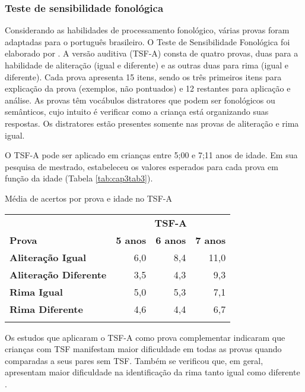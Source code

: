 \documentclass[output=paper,colorlinks,citecolor=brown,booklanguage=portuguese]{langscibook}
\begin{document}
\subsubsection{Teste de sensibilidade fonológica}
Considerando as habilidades de processamento fonológico, várias provas foram adaptadas para o português brasileiro. O Teste de Sensibilidade Fonológica foi elaborado por \citet{Herrero2001}. A versão auditiva (TSF-A) consta de quatro provas, duas para a habilidade de aliteração (igual e diferente) e as outras duas para rima (igual e diferente). Cada prova apresenta 15 itens, sendo os três primeiros itens para explicação da prova (exemplos, não pontuados) e 12 restantes para aplicação e análise. As provas têm vocábulos distratores que podem ser fonológicos ou semânticos, cujo intuito é verificar como a criança está organizando suas respostas. Os distratores estão presentes somente nas provas de aliteração e rima igual. 

O TSF-A pode ser aplicado em crianças entre 5;00 e 7;11 anos de idade. Em sua pesquisa de mestrado, \citet{Herrero2001} estabeleceu os valores esperados para cada prova em função da idade (Tabela \ref{tab:cap3tab3}). 




\begin{Tabela}
\caption{Média de acertos por prova e idade no TSF-A}
\label{tab:cap3tab3}


\begin{tabularx}{.65\textwidth}{lrrr}
\lsptoprule
 & \multicolumn{3}{c}{\textbf{TSF-A}} \\
 \cmidrule(lr){2-4}
 \textbf{Prova} & \textbf{5 anos} & \textbf{6 anos} & \textbf{7 anos}\\
 \midrule
 \textbf{Aliteração Igual} & 6,0 & 8,4 & 11,0\\
 \textbf{Aliteração Diferente} & 3,5 & 4,3 & 9,3\\
 \textbf{Rima Igual} & 5,0 & 5,3 & 7,1\\
 \textbf{Rima Diferente} & 4,6 & 4,4 & 6,7\\
 \lspbottomrule
\end{tabularx}
\end{Tabela}

Os estudos que aplicaram o TSF-A como prova complementar indicaram que crianças com TSF manifestam maior dificuldade em todas as provas quando comparadas a seus pares sem TSF. Também se verificou que, em geral, apresentam maior dificuldade na identificação da rima tanto igual como diferente \citep{Wertzner2012}.
\end{document}
